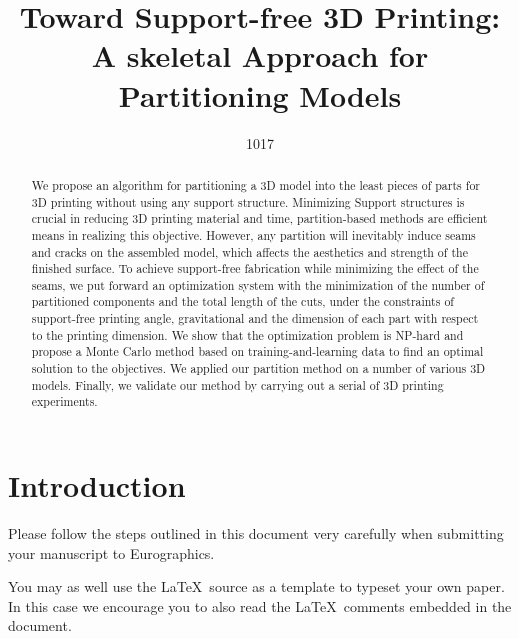 \documentclass{egpubl}
\title[EG \LaTeX\ Author Guidelines]%
      {Toward Support-free 3D Printing: A skeletal Approach for Partitioning Models}
\author[1017]{1017}
\begin{document}

\maketitle

\begin{abstract}
   We propose an algorithm for partitioning a 3D model into the least pieces of parts for 3D printing without using any support structure. Minimizing Support structures is crucial in reducing 3D printing material and time, partition-based methods are efficient means in realizing this objective. However, any partition will inevitably induce seams and cracks on the assembled model, which affects the aesthetics and strength of the finished surface. To achieve support-free fabrication while minimizing the effect of the seams, we put forward an optimization system with the minimization of the number of partitioned components and the total length of the cuts, under the constraints of support-free printing angle, gravitational and the dimension of each part with respect to the printing dimension. We show that the optimization problem is NP-hard and propose a Monte Carlo method based on training-and-learning data to find an optimal solution to the objectives. We applied our partition method on a number of various 3D models. Finally, we validate our method by carrying out a serial of 3D printing experiments.


\begin{classification} %
\end{classification}

\end{abstract}





\section{Introduction}

Please follow the steps outlined in this document very carefully when
submitting your manuscript to Eurographics.

You may as well use the \LaTeX\ source as a template to typeset your own
paper. In this case we encourage you to also read the \LaTeX\ comments
embedded in the document.
\end{document}
